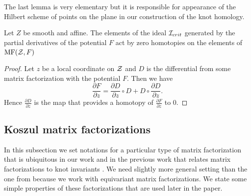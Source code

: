 \documentclass[10pt]{amsart}
\begin{document}
The last lemma is very elementary but it is responsible for appearance of the Hilbert scheme of points on the plane in our construction of the knot homology.

\begin{lemma}\label{lem: crit} Let \(Z\) be smooth and affine. The elements of the ideal $\mathcal{I}_{crit}$ generated by the partial derivatives of the potential
$F$ act by zero homotopies on the elements of $\mathrm{MF}(\mathcal{Z},F)$
\end{lemma}
\begin{proof}
Let $z$ be a local coordinate on $\mathcal{Z}$ and $D$ is the differential from some matrix factorization with
the potential $F$. Then we have
$$ \frac{\partial F}{\partial z}=\frac{\partial D}{\partial z}\circ D+ D\circ \frac{\partial D}{\partial z}.$$
Hence $\frac{\partial D}{\partial z}$ is the map that provides a homotopy of $\frac{\partial F}{\partial z}$ to $0$.
\end{proof}

\subsection{Koszul matrix factorizations}\label{ssec: str eq Kosz} In this subsection we set notations for a particular type of matrix factorization that is ubiquitous in our work and in the previous work that relates
matrix factorizations to knot invariants \cite{KR}. We need slightly more general setting than the one from \cite{KR} because we work with equivariant matrix factorizations.
We state some simple properties of these factorizations that are used later in the paper.
\end{document}
